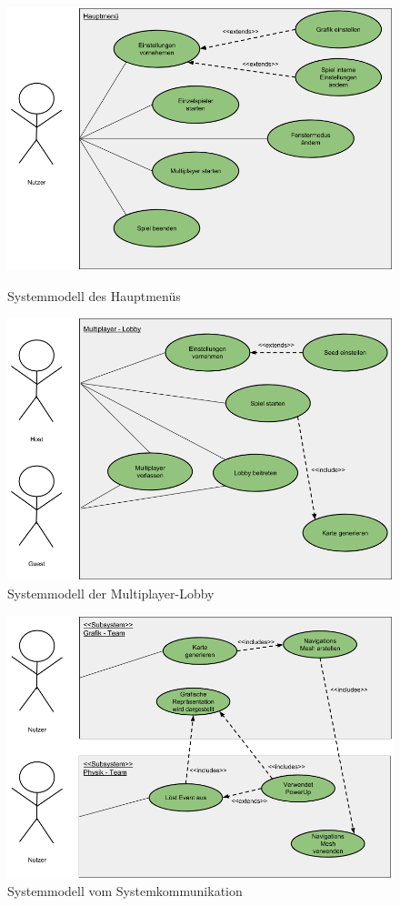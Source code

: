 \documentclass[parskip=full]{scrartcl}
\begin{document}
	\begin{figure}[!h]
	\centering
    \centering
    	\includegraphics[width=.85\linewidth]{./Bilder/Systemmodell_Hauptmenu.png}
  		\caption{Systemmodell des Hauptmenüs}
  	 	\label{fig:Systemmodell_Hauptmenu}
  	 	
  	 	\vspace{0.7cm}
  	 	
    	\includegraphics[width=.85\linewidth]{./Bilder/Systemmodell_Multiplayer_Lobby.png}
  		\caption{Systemmodell der Multiplayer-Lobby}
  	 	\label{fig:Systemmodell_Multiplayer_Lobby}

	\end{figure}
	
	\begin{figure}[h]
	\centering
	\centering
    	\includegraphics[width=.85\linewidth]{./Bilder/Systemmodell_System_Kommunikation.png}
  		\caption{Systemmodell vom Systemkommunikation}
  	 	\label{fig:Systemmodell_System_Kommunikation}
	\end{figure}	 
	 
\end{document}
